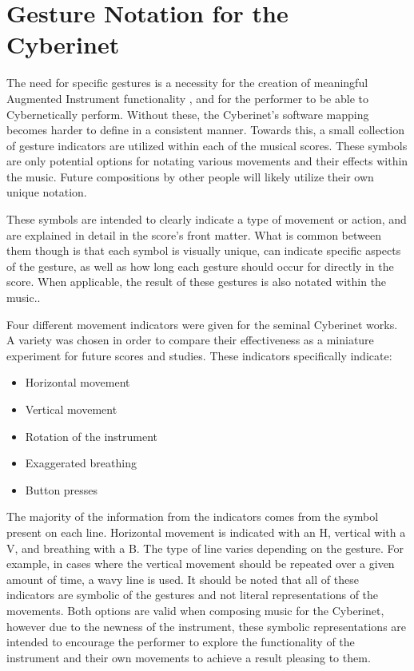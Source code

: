 \section{Gesture Notation for the Cyberinet}

The need for specific gestures is a necessity for the creation of meaningful Augmented Instrument functionality\cite{wanderleyClarinetGesture2005} \cite{miranda_Wanderley_instrumentControl_2006}, and for the performer to be able to Cybernetically perform. Without these, the Cyberinet's software mapping becomes harder to define in a consistent manner. Towards this, a small collection of gesture indicators are utilized within each of the musical scores. These symbols are only potential options for notating various movements and their effects within the music. Future compositions by other people will likely utilize their own unique notation.

These symbols are intended to clearly indicate a type of movement or action, and are explained in detail in the score's front matter. What is common between them though is that each symbol is visually unique, can indicate specific aspects of the gesture, as well as how long each gesture should occur for directly in the score. When applicable, the result of these gestures is also notated within the music.. 

Four different movement indicators were given for the seminal Cyberinet works. A variety was chosen in order to compare their effectiveness as a miniature experiment for future scores and studies. These indicators specifically indicate: 

\begin{itemize}
    \item Horizontal movement
    \item Vertical movement
    \item Rotation of the instrument
    \item Exaggerated breathing
    \item Button presses
\end{itemize}

The majority of the information from the indicators comes from the symbol present on each line. Horizontal movement is indicated with an H, vertical with a V, and breathing with a B. The type of line varies depending on the gesture. For example, in cases where the vertical movement should be repeated over a given amount of time, a wavy line is used. It should be noted that all of these indicators are symbolic of the gestures and not literal representations of the movements. Both options are valid when composing music for the Cyberinet, however due to the newness of the instrument, these symbolic representations are intended to encourage the performer to explore the functionality of the instrument and their own movements to achieve a result pleasing to them. 

